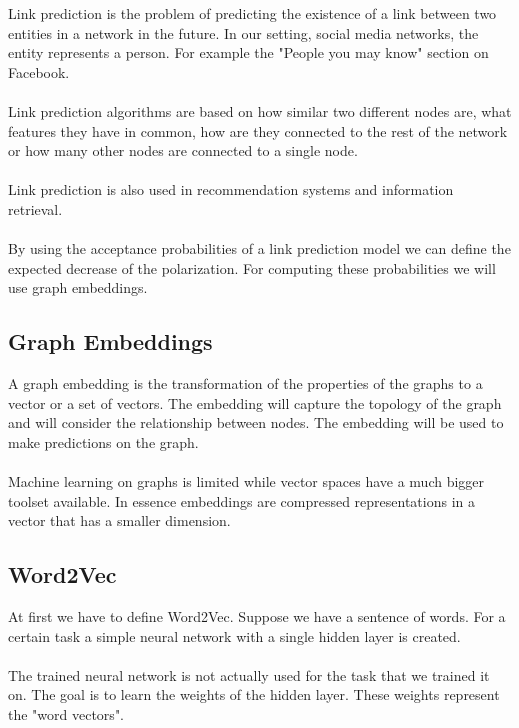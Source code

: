 Link prediction is the problem of predicting the existence of a link between two entities in a network in the future. In our setting, social media networks, the entity represents a person. For example the "People you may know" section on Facebook.		
 \\		
 \\		
 Link prediction algorithms are based on how similar two different nodes are, what features they have in common, how are they connected to the rest of the network or how many other nodes are connected to a single node. 		
 \\		
 \\		
 Link prediction is also used in recommendation systems and  information retrieval.
 \\
 \\
 By using the acceptance probabilities of a link prediction model we can define the expected decrease of the polarization. For computing these probabilities we will use graph embeddings.

  \subsection{Graph Embeddings}		
 \label{sec:embeddings}		

  A graph embedding is the transformation of the properties of the graphs to a vector or a set of vectors. The embedding will capture the topology of the graph and will consider the relationship between nodes. The embedding will be used to make predictions on the graph.		
 \\		
 \\		
 \noindent Machine learning on graphs is limited while vector spaces have a much bigger toolset available. In essence embeddings are compressed representations in a vector that has a smaller dimension.		

  \subsection{Word2Vec}		

 At first we have to define Word2Vec. Suppose we have a sentence of words. For a certain task a simple neural network with a single hidden layer is created. 
 \\
 \\
 The trained neural network is not actually used for the task that we trained it on. The goal is to learn the weights of the hidden layer. These weights represent the "word vectors".		
\clearpage

